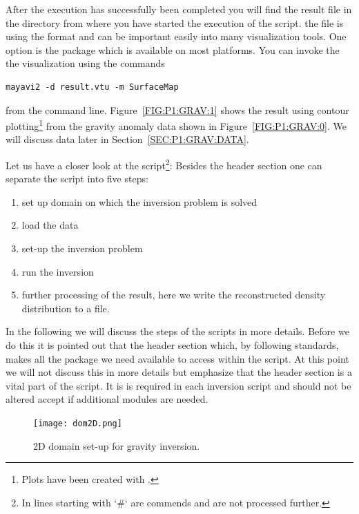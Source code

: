 After the execution has successfully been completed you will find the result file  in the directory
from where you have started the execution of the script. the file is using the \VTK format and can be important 
easily into many visualization tools. One option is the \mayavi package which is available on most platforms. You can invoke the
the visualization using the commands
\begin{verbatim}
mayavi2 -d result.vtu -m SurfaceMap
\end{verbatim}
from the command line. Figure~\ref{FIG:P1:GRAV:1} shows the result using contour plotting\footnote{Plots
have been created with \VisIt.} from the gravity anomaly data shown in Figure~\ref{FIG:P1:GRAV:0}. We will 
discuss data later in Section~\ref{SEC:P1:GRAV:DATA}.

Let us have a closer look at the script\footnote{In \python lines starting with `\#` are commends and are not processed further.}: Besides the header section one can separate the script into five steps:
\begin{enumerate}
 \item set up domain on which the inversion problem is solved
 \item load the data 
\item set-up the inversion problem
\item run the inversion
\item further processing of the result, here we write the reconstructed density distribution to a file.
\end{enumerate}
In the following we will discuss the steps of the scripts in more details. Before we do this it is pointed out that
the header section which, by following \python standards, makes all the package we need available to access within the script. At this
point we will not discuss this in more details but emphasize that the header section is a vital part of the script. It is is required 
in each \downunder inversion script and should not be altered accept if additional modules are needed. 

\begin{figure}
\centering
\texttt{[image: dom2D.png]}
\caption{2D domain set-up for gravity inversion.}
\label{FIG:P1:GRAV:2}
\end{figure}

